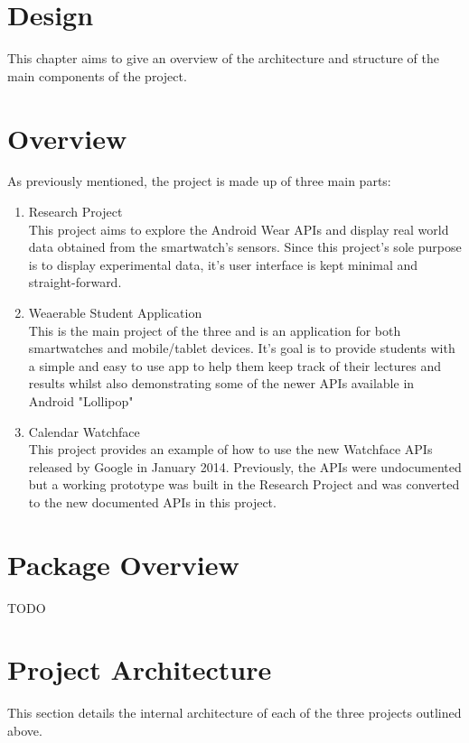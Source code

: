 \section{Design}

This chapter aims to give an overview of the architecture and structure of the
main components of the project.

\section{Overview}
As previously mentioned, the project is made up of three main parts:
\begin{enumerate}
\item Research Project\\
This project aims to explore the Android Wear APIs and display real world data
obtained from the smartwatch's sensors. Since this project's sole purpose is to
display experimental data, it's user interface is kept minimal and
straight-forward.
\item Weaerable Student Application\\
This is the main project of the three and is an application for both
smartwatches and mobile/tablet devices. It's goal is to provide students with
a simple and easy to use app to help them keep track of their lectures and
results whilst also demonstrating some of the newer APIs available in Android
"Lollipop"
\item Calendar Watchface\\
This project provides an example of how to use the new Watchface APIs released
by Google in January 2014. Previously, the APIs were undocumented but a working
prototype was built in the Research Project and was converted to the new
documented APIs in this project.

\end{enumerate}

\section{Package Overview}
TODO

\section{Project Architecture}
This section details the internal architecture of each of the three projects
outlined above.

